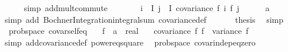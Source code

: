 \begin{isabellebody}
\ \ \ \ \isamarkupfalse%
\ {\isacharparenleft}{\kern0pt}simp\ add{\isacharcolon}{\kern0pt}mult{\isachardot}{\kern0pt}commute{\isacharparenright}{\kern0pt}\isanewline
\ \ \isamarkupfalse%
\ \isamarkupfalse%
\ {\isachardoublequoteopen}{\isachardot}{\kern0pt}{\isachardot}{\kern0pt}{\isachardot}{\kern0pt}\ {\isacharequal}{\kern0pt}\ {\isacharparenleft}{\kern0pt}{\isasymSum}i\ {\isasymin}\ I{\isachardot}{\kern0pt}\ {\isacharparenleft}{\kern0pt}{\isasymSum}j\ {\isasymin}\ I{\isachardot}{\kern0pt}\ covariance\ {\isacharparenleft}{\kern0pt}f\ i{\isacharparenright}{\kern0pt}\ {\isacharparenleft}{\kern0pt}f\ j{\isacharparenright}{\kern0pt}{\isacharparenright}{\kern0pt}{\isacharparenright}{\kern0pt}{\isachardoublequoteclose}\isanewline
\ \ \ \ \isamarkupfalse%
\ a\ \isamarkupfalse%
\ {\isacharparenleft}{\kern0pt}simp\ add{\isacharcolon}{\kern0pt}\ Bochner{\isacharunderscore}{\kern0pt}Integration{\isachardot}{\kern0pt}integral{\isacharunderscore}{\kern0pt}sum\ covariance{\isacharunderscore}{\kern0pt}def{\isacharparenright}{\kern0pt}\ \isanewline
\ \ \isamarkupfalse%
\ \isamarkupfalse%
\ {\isacharquery}{\kern0pt}thesis\ \isamarkupfalse%
\ simp\isanewline
{}\isamarkupfalse%
%
\endisatagproof
{\isafoldproof}%
%
\isadelimproof
\isanewline
%
\endisadelimproof
\isanewline
{}\isamarkupfalse%
\ {\isacharparenleft}{\kern0pt}\ prob{\isacharunderscore}{\kern0pt}space{\isacharparenright}{\kern0pt}\ covar{\isacharunderscore}{\kern0pt}self{\isacharunderscore}{\kern0pt}eq{\isacharcolon}{\kern0pt}\isanewline
\ \ \ f\ {\isacharcolon}{\kern0pt}{\isacharcolon}{\kern0pt}\ {\isachardoublequoteopen}{\isacharprime}{\kern0pt}a\ {\isasymRightarrow}\ real{\isachardoublequoteclose}\isanewline
\ \ \ {\isachardoublequoteopen}covariance\ f\ f\ {\isacharequal}{\kern0pt}\ variance\ f{\isachardoublequoteclose}\isanewline
%
\isadelimproof
\ \ %
\endisadelimproof
%
\isatagproof
{}\isamarkupfalse%
\ {\isacharparenleft}{\kern0pt}simp\ add{\isacharcolon}{\kern0pt}covariance{\isacharunderscore}{\kern0pt}def\ power{}{\isacharunderscore}{\kern0pt}eq{\isacharunderscore}{\kern0pt}square{\isacharparenright}{\kern0pt}%
\endisatagproof
{\isafoldproof}%
%
\isadelimproof
\isanewline
%
\endisadelimproof
\isanewline
{}\isamarkupfalse%
\ {\isacharparenleft}{\kern0pt}\ prob{\isacharunderscore}{\kern0pt}space{\isacharparenright}{\kern0pt}\ covar{\isacharunderscore}{\kern0pt}indep{\isacharunderscore}{\kern0pt}eq{\isacharunderscore}{\kern0pt}zero{\isacharcolon}{\kern0pt}\isanewline

\end{isabellebody}
